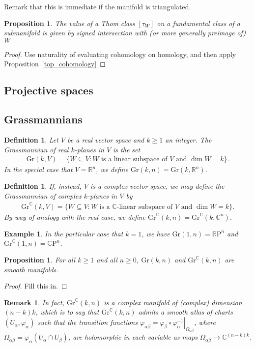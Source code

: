\documentclass{amsart}          %
\newtheorem{proposition}[theorem]{Proposition}
\newtheorem{definition}[theorem]{Definition}
\newtheorem{remark}[theorem]{Remark}
\newtheorem{example}[theorem]{Example}
\newcommand{\R}{\mathbb R}
\newcommand{\C}{\mathbb C}
\newcommand{\RP}{\mathbb{R}\mathrm{P}}
\newcommand{\CP}{\mathbb{C}\mathrm{P}}
\newcommand{\Gr}{\mathrm{Gr}}
\begin{document}
Remark that this is immediate if the manifold is triangulated.

\begin{proposition}
The value of a Thom class $[\tau_W]$ on  a fundamental class of a submanifold is given by signed intersection with 
(or more generally preimage of) $W$
\end{proposition}

\begin{proof}
Use naturality of evaluating cohomology on homology, and then apply Proposition~\ref{top_cohomology}
\end{proof}


\subsection{Projective spaces}

\subsection{Grassmannians}
\begin{definition}
	Let $V$ be a real vector space and $k\geq 1$ an integer. The \textit{Grassmannian of real $k$-planes in $V$} is the set\begin{align*}
	\Gr(k,V)=\{W\subseteq V:\text{$W$ is a linear subspace of $V$ and $\dim W=k$}\}.
	\end{align*}
	In the special case that $V=\R^n$, we define $\Gr(k,n)=\Gr(k,\R^n)$.
\end{definition}
\begin{definition}
	If, instead, $V$ is a \textit{complex} vector space, we may define the \textit{Grassmannian of complex $k$-planes in $V$} by\begin{align*}
	\Gr^\C(k,V)=\{W\subseteq V:\text{$W$ is a $\C$-linear subspace of $V$ and $\dim W=k$}\}.
	\end{align*}
	By way of analogy with the real case, we define $\Gr^\C(k,n)=\Gr^\C(k,\C^n)$.
\end{definition}
\begin{example}
	In the particular case that $k=1$, we have $\Gr(1,n)=\RP^n$ and $\Gr^\C(1,n)=\CP^n$.
\end{example}
\begin{proposition}
	For all $k\geq 1$ and all $n\geq 0$, $\Gr(k,n)$ and $\Gr^\C(k,n)$ are smooth manifolds.
\end{proposition}
\begin{proof}
	Fill this in.
\end{proof}
\begin{remark}
	In fact, $\Gr^\C(k,n)$ is a complex manifold of (complex) dimension $(n-k)k$, which is to say that $\Gr^\C(k,n)$ admits a smooth atlas of charts $(U_\alpha,\varphi_\alpha)$ such that the transition functions $\varphi_{\alpha\beta}=\left.\varphi_\beta\circ\varphi_{\alpha}^{-1}\right|_{\Omega_{\alpha\beta}}$, where $\Omega_{\alpha\beta}=\varphi_\alpha(U_\alpha\cap U_\beta)$, are holomorphic in each variable as maps $\Omega_{\alpha\beta}\to\C^{(n-k)k}$.
\end{remark}
\end{document}
